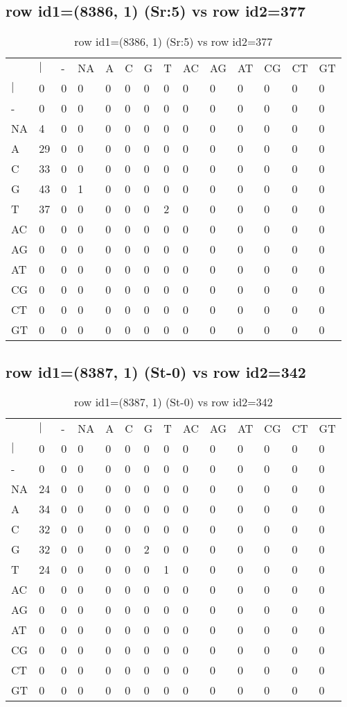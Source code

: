 \subsection{row id1=(8386, 1) (Sr:5) vs row id2=377}
\begin{center}
\begin{longtable}{|l|l|l|l|l|l|l|l|l|l|l|l|l|l|}
\caption{row id1=(8386, 1) (Sr:5) vs row id2=377} \label{table_dm440}\\
\hline
\\
\hline
&$|$&-&NA&A&C&G&T&AC&AG&AT&CG&CT&GT\\
$|$&0&0&0&0&0&0&0&0&0&0&0&0&0\\
-&0&0&0&0&0&0&0&0&0&0&0&0&0\\
NA&4&0&0&0&0&0&0&0&0&0&0&0&0\\
A&29&0&0&0&0&0&0&0&0&0&0&0&0\\
C&33&0&0&0&0&0&0&0&0&0&0&0&0\\
G&43&0&1&0&0&0&0&0&0&0&0&0&0\\
T&37&0&0&0&0&0&2&0&0&0&0&0&0\\
AC&0&0&0&0&0&0&0&0&0&0&0&0&0\\
AG&0&0&0&0&0&0&0&0&0&0&0&0&0\\
AT&0&0&0&0&0&0&0&0&0&0&0&0&0\\
CG&0&0&0&0&0&0&0&0&0&0&0&0&0\\
CT&0&0&0&0&0&0&0&0&0&0&0&0&0\\
GT&0&0&0&0&0&0&0&0&0&0&0&0&0\\
\hline
\end{longtable}
\end{center}

\subsection{row id1=(8387, 1) (St-0) vs row id2=342}
\begin{center}
\begin{longtable}{|l|l|l|l|l|l|l|l|l|l|l|l|l|l|}
\caption{row id1=(8387, 1) (St-0) vs row id2=342} \label{table_dm442}\\
\hline
\\
\hline
&$|$&-&NA&A&C&G&T&AC&AG&AT&CG&CT&GT\\
$|$&0&0&0&0&0&0&0&0&0&0&0&0&0\\
-&0&0&0&0&0&0&0&0&0&0&0&0&0\\
NA&24&0&0&0&0&0&0&0&0&0&0&0&0\\
A&34&0&0&0&0&0&0&0&0&0&0&0&0\\
C&32&0&0&0&0&0&0&0&0&0&0&0&0\\
G&32&0&0&0&0&2&0&0&0&0&0&0&0\\
T&24&0&0&0&0&0&1&0&0&0&0&0&0\\
AC&0&0&0&0&0&0&0&0&0&0&0&0&0\\
AG&0&0&0&0&0&0&0&0&0&0&0&0&0\\
AT&0&0&0&0&0&0&0&0&0&0&0&0&0\\
CG&0&0&0&0&0&0&0&0&0&0&0&0&0\\
CT&0&0&0&0&0&0&0&0&0&0&0&0&0\\
GT&0&0&0&0&0&0&0&0&0&0&0&0&0\\
\hline
\end{longtable}
\end{center}

